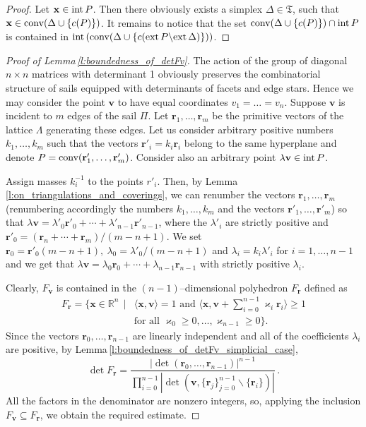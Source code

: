 \documentclass[11pt]{article}
\theoremstyle{definition}
\theoremstyle{remark}
\theoremstyle{plain}
\renewcommand{\vec}[1]{\mathbf{#1}}
\renewcommand{\geq}{\geqslant}
\newcommand{\conv}{\textup{conv}}
\newcommand{\ext}{\textup{ext\,}}
\newcommand{\interior}{\textup{int\,}}
\newcommand{\sail}{\Pi}
\newcommand{\La}{\Lambda}
\newcommand{\R}{\mathbb{R}}
\begin{document}
  \begin{proof}
    Let $\vec x\in\interior P$. Then there obviously exists a simplex $\Delta\in\mathfrak T$,
    such that $\vec x\in\conv(\Delta\cup\{c(P)\})$. It remains to notice
    that the set $\conv(\Delta\cup\{c(P)\})\cap\interior P$ is contained in
    $\interior(\conv(\Delta\cup\{ c(\ext P\backslash\ext\Delta) \}))$.
  \end{proof}

  \begin{proof}[Proof of Lemma\,\ref{l:boundedness_of_detFv}]
    The action of the group of diagonal $n\times n$ matrices with determinant 1 obviously
    preserves the combinatorial structure of sails equipped with determinants of facets and
    edge stars. Hence we may consider the point $\vec v$ to have equal coordinates
    $v_1=\ldots=v_n$. Suppose $\vec v$ is incident to $m$ edges of the sail $\sail$. Let
    $\vec r_1,\ldots,\vec r_m$ be the primitive vectors of the lattice $\La$ generating these
    edges. Let us consider arbitrary positive numbers $k_1,\ldots,k_m$ such that the vectors
    $\vec r'_i=k_i\vec r_i$ belong to the same hyperplane and denote
    $P=\conv(\vec r'_1,\ldots,\vec r'_m)$. Consider also an arbitrary point
    $\lambda\vec v\in\interior P$.

    Assign masses $k_i^{-1}$ to the points $r'_i$. Then, by
    Lemma\,\ref{l:on_triangulations_and_coverings}, we can renumber the vectors
    $\vec r_1,\ldots,\vec r_m$ (renumbering accordingly the numbers $k_1,\ldots,k_m$ and the
    vectors $\vec r'_1,\ldots,\vec r'_m$) so that
    $\lambda\vec v=\lambda'_0\vec r'_0+\cdots+\lambda'_{n-1}\vec r'_{n-1}$, where the
    $\lambda'_i$ are strictly positive and $\vec r'_0=(\vec r_n+\cdots+\vec r_m)/(m-n+1)$. We
    set $\vec r_0=\vec r'_0(m-n+1),\ \lambda_0=\lambda'_0/(m-n+1)$ and
    $\lambda_i=k_i\lambda'_i$ for $i=1,\ldots,n-1$ and we get that
    $\lambda\vec v=\lambda_0\vec r_0+\cdots+\lambda_{n-1}\vec r_{n-1}$ with strictly positive
    $\lambda_i$.

    Clearly, $F_{\vec v}$ is contained in the $(n-1)$--dimensional polyhedron $F_{\vec r}$
    defined as
    \[ \begin{array}{rl}
         F_{\vec r}=\big\{ \vec x\in\R^n \ \ \big| &
         \langle\vec x,\vec v\rangle=1 \text{ and }
         \langle\vec x,\vec v+\displaystyle\sum_{i=0}^{n-1}\varkappa_i\vec r_i\rangle\geq 1 \\
         & \text{for all } \varkappa_0\geq 0,\ldots,\varkappa_{n-1}\geq 0 \big\}.
       \end{array} \]
    Since the vectors $\vec r_0,\ldots,\vec r_{n-1}$ are linearly independent and all of the
    coefficients $\lambda_i$ are positive, by
    Lemma\,\ref{l:boundedness_of_detFv_simplicial_case},
    \[ \det F_{\vec r}=\frac{|\det(\vec r_0,\ldots,\vec r_{n-1})|^{n-1}}
       {\prod_{i=0}^{n-1}|\det(\vec v,\{\vec r_j\}_{j=0}^{n-1}\backslash\{\vec r_i\})|}\,. \]
    All the factors in the denominator are nonzero integers, so, applying the inclusion
    $F_{\vec v}\subseteq F_{\vec r}$, we obtain the required estimate.
  \end{proof}
\end{document}
